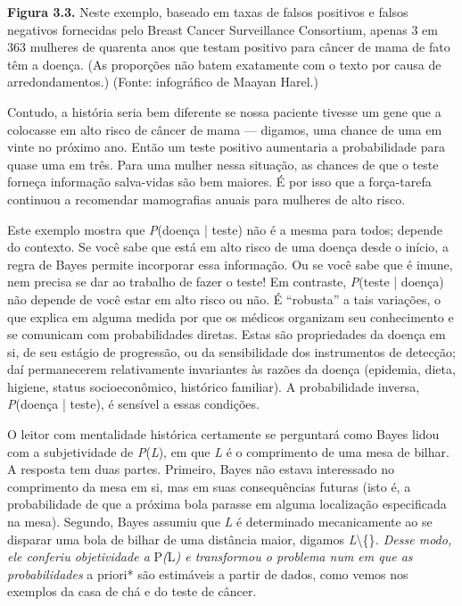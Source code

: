 \documentclass[11pt,a5paper,twoside]{book}
\begin{document}
\textbf{Figura 3.3.} Neste exemplo, baseado em taxas de falsos positivos e falsos negativos fornecidas pelo Breast Cancer Surveillance Consortium, apenas 3 em 363 mulheres de quarenta anos que testam positivo para câncer de mama de fato têm a doença. (As proporções não batem exatamente com o texto por causa de arredondamentos.) (Fonte: infográfico de Maayan Harel.)

Contudo, a história seria bem diferente se nossa paciente tivesse um gene que a colocasse em alto risco de câncer de mama — digamos, uma chance de uma em vinte no próximo ano. Então um teste positivo aumentaria a probabilidade para quase uma em três. Para uma mulher nessa situação, as chances de que o teste forneça informação salva-vidas são bem maiores. É por isso que a força-tarefa continuou a recomendar mamografias anuais para mulheres de alto risco.

Este exemplo mostra que \textit{P}(doença | teste) não é a mesma para todos; depende do contexto. Se você sabe que está em alto risco de uma doença desde o início, a regra de Bayes permite incorporar essa informação. Ou se você sabe que é imune, nem precisa se dar ao trabalho de fazer o teste! Em contraste, \textit{P}(teste | doença) não depende de você estar em alto risco ou não. É “robusta” a tais variações, o que explica em alguma medida por que os médicos organizam seu conhecimento e se comunicam com probabilidades diretas. Estas são propriedades da doença em si, de seu estágio de progressão, ou da sensibilidade dos instrumentos de detecção; daí permanecerem relativamente invariantes às razões da doença (epidemia, dieta, higiene, status socioeconômico, histórico familiar). A probabilidade inversa, \textit{P}(doença | teste), é sensível a essas condições.

O leitor com mentalidade histórica certamente se perguntará como Bayes lidou com a subjetividade de \textit{P}(\textit{L}), em que \textit{L} é o comprimento de uma mesa de bilhar. A resposta tem duas partes. Primeiro, Bayes não estava interessado no comprimento da mesa em si, mas em suas consequências futuras (isto é, a probabilidade de que a próxima bola parasse em alguma localização especificada na mesa). Segundo, Bayes assumiu que \textit{L} é determinado mecanicamente ao se disparar uma bola de bilhar de uma distância maior, digamos \textit{L}\textbackslash\{\}\textit{. Desse modo, ele conferiu objetividade a }P\textit{(}L\textit{) e transformou o problema num em que as probabilidades }a priori* são estimáveis a partir de dados, como vemos nos exemplos da casa de chá e do teste de câncer.
\end{document}

